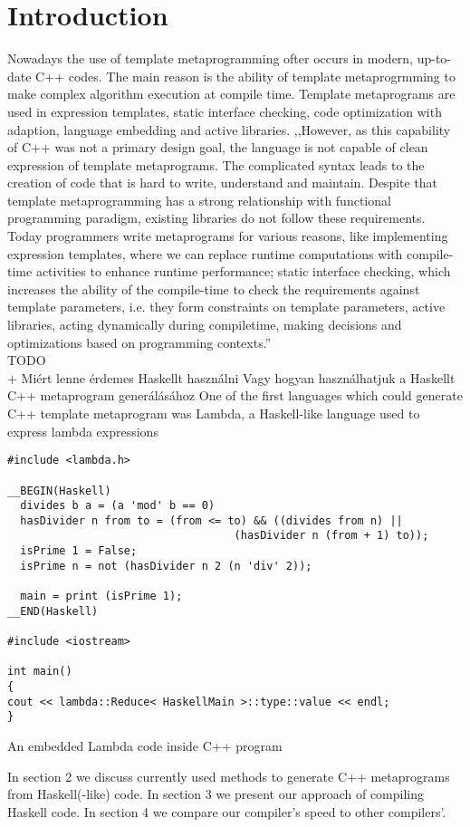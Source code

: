 \documentclass{article}
\begin{document}
\section{Introduction}
Nowadays the use of template metaprogramming ofter occurs in modern, up-to-date C++ codes. The main reason is the ability of template metaprogrmming to make complex algorithm execution at compile time. Template metaprograms are used in expression templates, static interface checking, code optimization with adaption, language embedding and active libraries. ,,However, as this capability of C++ was not a primary design goal, the
language is not capable of clean expression of template metaprograms. The complicated syntax leads to the creation of code that
is hard to write, understand and maintain. Despite that template
metaprogramming has a strong relationship with functional programming paradigm, existing libraries do not follow these requirements. Today programmers write metaprograms for various reasons,
like implementing expression templates, where we can replace
runtime computations with compile-time activities to enhance runtime performance; static interface checking, which increases the
ability of the compile-time to check the requirements against template parameters, i.e. they form constraints on template parameters, active libraries, acting dynamically during compiletime, making decisions and optimizations based on programming
contexts.'' \cite{porkolab2009c++}  \\
TODO \\
\colorbox{orange!30}{+ Miért lenne érdemes Haskellt használni}
\colorbox{orange!30}{Vagy hogyan használhatjuk a Haskellt} 
\colorbox{orange!30}{C++ metaprogram generálásához}
One of the first languages which could generate C++ template metaprogram was Lambda, a Haskell-like language used to express lambda expressions \cite{porkolab2009functional}
\begin{center}
\begin{lstlisting}
#include <lambda.h>

__BEGIN(Haskell)
  divides b a = (a 'mod' b == 0)
  hasDivider n from to = (from <= to) && ((divides from n) ||
                                   (hasDivider n (from + 1) to));
  isPrime 1 = False;
  isPrime n = not (hasDivider n 2 (n 'div' 2));

  main = print (isPrime 1);
__END(Haskell)

#include <iostream>

int main()
{
cout << lambda::Reduce< HaskellMain >::type::value << endl;
}
\end{lstlisting}
An embedded Lambda code inside C++ program
\end{center}
In section 2 we discuss currently used methods to generate C++ metaprograms from Haskell(-like) code. In section 3 we present our approach of compiling Haskell code. In section 4 we compare our compiler's speed to other compilers'.
\end{document}
